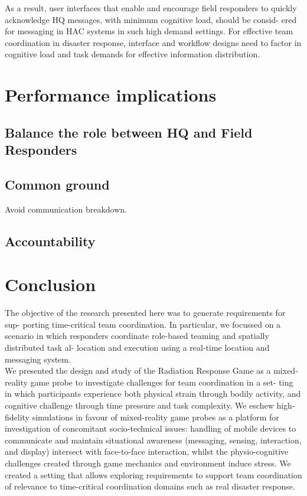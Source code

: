As a result, user interfaces that enable and encourage field responders to quickly acknowledge HQ messages, with minimum cognitive load, should be consid- ered for messaging in HAC systems in such high demand settings. For effective team coordination in disaster response, interface and workflow designs need to factor in cognitive load and task demands for effective information distribution.\\

\section{Performance implications}
\subsection{Balance the role between HQ and Field Responders}
\subsection{Common ground}
Avoid communication breakdown.
\subsection{Accountability}


\section{Conclusion}
The objective of the research presented here was to generate requirements for sup- porting time-critical team coordination. In particular, we focussed on a scenario in which responders coordinate role-based teaming and spatially distributed task al- location and execution using a real-time location and messaging system.\\

We presented the design and study of the Radiation Response Game as a mixed-reality game probe to investigate challenges for team coordination in a set- ting in which participants experience both physical strain through bodily activity, and cognitive challenge through time pressure and task complexity. We eschew high-fidelity simulations in favour of mixed-reality game probes as a platform for investigation of concomitant socio-technical issues: handling of mobile devices to communicate and maintain situational awareness (messaging, sensing, interaction, and display) intersect with face-to-face interaction, whilst the physio-cognitive challenges created through game mechanics and environment induce stress. We created a setting that allows exploring requirements to support team coordination of relevance to time-critical coordination domains such as real disaster response.\\

